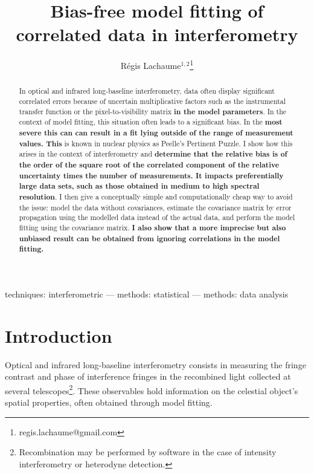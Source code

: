 \documentclass{pasa}
\title[Bias-free model fitting of correlated data in interferometry]{Bias-free model fitting of correlated data in interferometry}
\author[Lachaume]{R\'egis Lachaume$^{1,2}$\thanks{regis.lachaume@gmail.com}
\affil{$^{1}$Instituto de Astronom\'\i{}a, Facultad de F\'\i{}sica, Pontificia Universidad Cat\'olica de Chile, casilla 306, Santiago 22, Chile}%
\affil{$^{2}$Max-Planck-Institut f\"ur Astronomie, K\"onigstuhl 17, D-69117 Heidelberg, Germany}%
}
\def\correction#1{{\bfseries #1}}
\begin{document}
\begin{frontmatter}
\maketitle

\begin{abstract}
In optical and infrared long-baseline interferometry, data often display significant correlated errors because of uncertain multiplicative factors such as the instrumental transfer function or the pixel-to-visibility matrix \correction{in the model parameters}.  In the context of model fitting, this situation often leads to a significant bias. In the \correction{most severe this can can result in a fit lying outside of the range of measurement values. This} is known in nuclear physics as Peelle's Pertinent Puzzle.  I show how this arises in the context of interferometry and \correction{determine that the relative bias is of the order of the square root of the correlated component of the relative uncertainty times the number of measurements. It impacts preferentially large data sets, such as those obtained in medium to high spectral resolution}.  I then give a conceptually simple and computationally cheap way to avoid the issue: model the data without covariances, estimate the covariance matrix by error propagation using the modelled data instead of the actual data, and perform the model fitting using the covariance matrix. \correction{I also show that a more imprecise but also unbiased result can be obtained from ignoring correlations in the model fitting.}
\end{abstract}

\begin{keywords}
techniques: interferometric --- 
methods: statistical ---
methods: data analysis
\end{keywords}

\end{frontmatter}

\section{Introduction}

Optical and infrared long-baseline interferometry consists in measuring the fringe contrast and phase of interference fringes in the recombined light collected at several telescopes\footnote{Recombination may be performed by software in the case of intensity interferometry or heterodyne detection.}. These observables hold information on the celestial object's spatial properties, often obtained through model fitting. 
\end{document}
